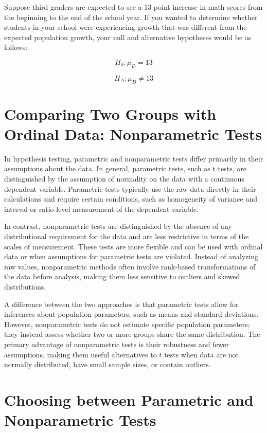 \documentclass[
  letterpaper,
  DIV=11,
  numbers=noendperiod]{scrreprt}
\begin{document}
Suppose third graders are expected to see a 13-point increase in math
scores from the beginning to the end of the school year. If you wanted
to determine whether students in your school were experiencing growth
that was different from the expected population growth, your null and
alternative hypotheses would be as follows:

\[
H_0 : \mu_D = 13
\]

\[
H_A : \mu_D \ne 13
\]

\section{Comparing Two Groups with Ordinal Data: Nonparametric
Tests}\label{comparing-two-groups-with-ordinal-data-nonparametric-tests}

In hypothesis testing, parametric and nonparametric tests differ
primarily in their assumptions about the data. In general, parametric
tests, such as t tests, are distinguished by the assumption of normality
on the data with a continuous dependent variable. Parametric tests
typically use the raw data directly in their calculations and require
certain conditions, such as homogeneity of variance and interval or
ratio-level measurement of the dependent variable.

In contrast, nonparametric tests are distinguished by the absence of any
distributional requirement for the data and are less restrictive in
terms of the scales of measurement. These tests are more flexible and
can be used with ordinal data or when assumptions for parametric tests
are violated. Instead of analyzing raw values, nonparametric methods
often involve rank-based transformations of the data before analysis,
making them less sensitive to outliers and skewed distributions.

A difference between the two approaches is that parametric tests allow
for inferences about population parameters, such as means and standard
deviations. However, nonparametric tests do not estimate specific
population parameters; they instead assess whether two or more groups
share the same distribution. The primary advantage of nonparametric
tests is their robustness and fewer assumptions, making them useful
alternatives to \(t\) tests when data are not normally distributed, have
small sample sizes, or contain outliers.

\section{Choosing between Parametric and Nonparametric
Tests}\label{choosing-between-parametric-and-nonparametric-tests}
\end{document}
